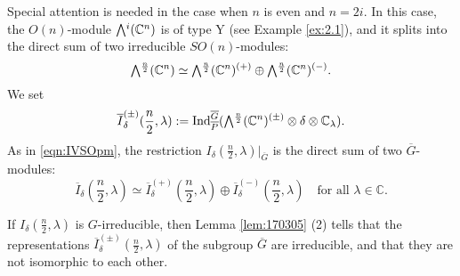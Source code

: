 Special attention is needed in the case
 when $n$ is even
 and $n=2i$.  
In this case,
 the $O(n)$-module $\Exterior^{i}({\mathbb{C}}^n)$ 
 is of type Y
 (see Example \ref{ex:2.1}), 
 and it splits into the direct sum
 of two irreducible $SO(n)$-modules:
\[
   \Exterior^{\frac n 2}({\mathbb{C}}^n) 
   \simeq 
   \Exterior^{\frac n 2}({\mathbb{C}}^n)^{(+)}
   \oplus
   \Exterior^{\frac n 2}({\mathbb{C}}^n)^{(-)}.  
\]
We set 
\[
   \overline I_{\delta}^{(\pm)}(\frac n 2, \lambda)
   :=
   {\operatorname{Ind}}_{\overline P}^{\overline G}
   (\Exterior^{\frac n 2}({\mathbb{C}}^n)^{(\pm)}
    \otimes \delta 
    \otimes {\mathbb{C}}_{\lambda}).  
\]
As in \eqref{eqn:IVSOpm}, 
 the restriction $I_{\delta}(\frac n 2, \lambda)|_{\overline G}$
 is the direct sum of two $\overline G$-modules:
\begin{equation}
\label{eqn:ISOneven}
   \overline I_{\delta}(\frac n 2, \lambda)
   \simeq
   \overline I_{\delta}^{(+)}(\frac n 2, \lambda)
   \oplus
   \overline{I}_{\delta}^{(-)}({\frac n 2}, \lambda)
\quad
\text{for all $\lambda \in {\mathbb{C}}$.}
\end{equation}



If $I_{\delta}(\frac n 2, \lambda)$ is $G$-irreducible, 
 then Lemma \ref{lem:170305} (2) tells
 that the representations $\overline {I}_{\delta}^{(\pm)}(\frac n 2, \lambda)$
 of the subgroup $\overline G$
 are irreducible,
 and that they are not isomorphic to each other.  



